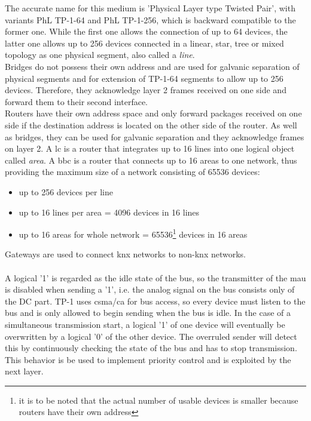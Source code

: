 The accurate name for this medium is 'Physical Layer type Twisted Pair', with variants
PhL \gls{TP}-1-64 and PhL \gls{TP}-1-256, which is backward compatible to the former one. While the first one allows
the connection of up to 64 devices, the latter one allows up to 256 devices connected in a linear, star, tree or
mixed topology as one physical segment, also called a \textit{line}.
\\
Bridges do not possess their own address and are used for galvanic separation of physical segments and for extension of TP-1-64 segments to allow up to 256 devices.
Therefore, they acknowledge layer 2 frames received on one side and forward them to their second interface. 
\\
Routers have their own address space and only forward packages received on one side if the destination address is located on the other side of the router.
As well as bridges, they can be used for galvanic separation and they acknowledge frames on layer 2.
A \gls{lc} is a router that integrates up to 16 lines into one logical object called \textit{area}. A \gls{bbc} is a router that connects
up to 16 areas to one network, thus providing the maximum size of a network consisting of 65536 devices:
\begin{itemize}
 \item up to 256 devices per line
 \item up to 16 lines per area = 4096 devices in 16 lines
 \item up to 16 areas for whole network = 65536\footnote{it is to be noted that the actual number of usable devices is smaller because routers have
 their own address} devices in 16 areas
\end{itemize}
Gateways are used to connect \gls{knx} networks to non-\gls{knx} networks.
\\
\\
A logical '1' is regarded as the idle state of the bus, so the transmitter of the \gls{mau} is disabled when sending a '1', i.e. the analog signal on
the bus consists only of the DC part. \gls{TP}-1 uses \gls{csma}/\gls{ca} for bus access, so every device must listen to the bus and is only allowed
to begin sending when the bus is idle. In the case of a simultaneous transmission start, a logical '1' of one
device will eventually be overwritten by a logical '0' of the other device. The overruled
sender will detect this by continuously checking the state of the bus and has to stop 
transmission. This behavior is be used to implement priority control and is exploited by the next layer.


